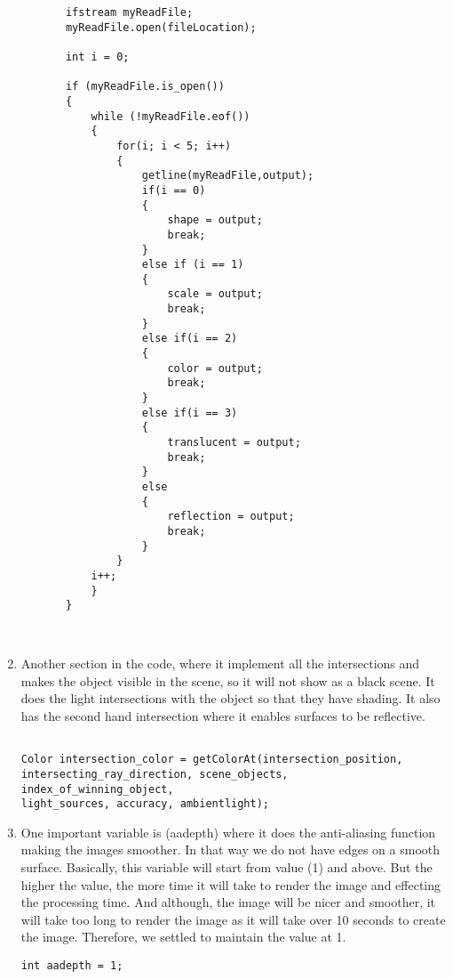 \documentclass{article}
\begin{document}
\begin{enumerate}
\begin{lstlisting}
       ifstream myReadFile;
       myReadFile.open(fileLocation);

       int i = 0;

       if (myReadFile.is_open())
       {
           while (!myReadFile.eof())
           {
               for(i; i < 5; i++)
               {
                   getline(myReadFile,output);
                   if(i == 0)
                   {
                       shape = output;
                       break;
                   }
                   else if (i == 1)
                   {
                       scale = output;
                       break;
                   }
                   else if(i == 2)
                   {
                       color = output;
                       break;
                   }
                   else if(i == 3)
                   {
                       translucent = output;
                       break;
                   }
                   else
                   {
                       reflection = output;
                       break;
                   }
               }
           i++;
           }
       }



     \end{lstlisting}

\item  Another section in the code, where it implement all the intersections and makes the object visible in the scene, so it will not show as a black scene.  It does the light intersections with the object so that they have shading. It also has the second hand intersection where it enables surfaces to be reflective.  
\begin{lstlisting}

Color intersection_color = getColorAt(intersection_position,
intersecting_ray_direction, scene_objects,
index_of_winning_object,
light_sources, accuracy, ambientlight); \end{lstlisting}

\item One important variable is (aadepth) where it does the anti-aliasing function making the images smoother. In that way we do not have edges on a smooth surface.  Basically, this variable will start from value (1) and above. But the higher the value, the more time it will take to render the image and effecting the processing time. And although, the image will be nicer and smoother, it will take too long to render the image as it will take over 10 seconds to create the image.  Therefore, we settled to maintain the value at 1.
\begin{lstlisting}
int aadepth = 1;
\end{lstlisting}


\end{enumerate}
\end{document}
